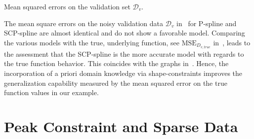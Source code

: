 \begin{table}[H]
	\begin{center}
	\end{center}
	\caption{Mean squared errors on the validation set $\mathcal{D}_v$.}
	\label{tab:test-func-peak-mses}
\end{table}
%
The mean square errors on the noisy validation data $\mathcal{D}_v$ in~ for P-spline and SCP-spline are almost identical and do not show a favorable model. Comparing the various models with the true, underlying function, see $\text{MSE}_{D_{v,true}}$ in~, leads to the assessment that the SCP-spline is the more accurate model with regards to the true function behavior. This coincides with the graphs in~. Hence, the incorporation of a priori domain knowledge via shape-constraints improves the generalization capability measured by the mean squared error on the true function values in our example. 

\section{Peak Constraint and Sparse Data} \label{sec:peak-behav-sparse}

